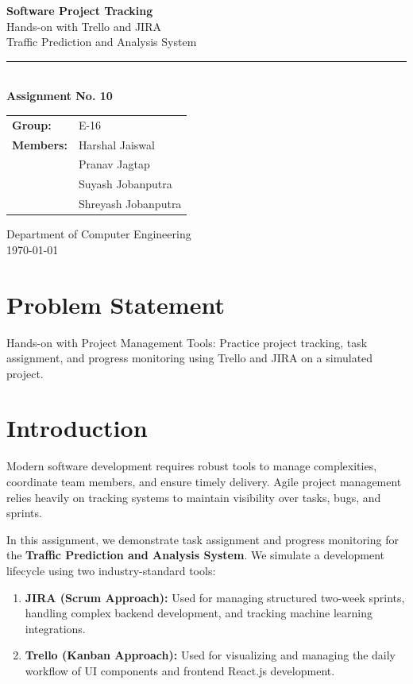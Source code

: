 \documentclass[12pt,a4paper]{article}
\begin{document}
\begin{titlepage}
\centering
\vspace*{2cm}
{\Huge\bfseries\color{headblue} Software Project Tracking\\[12pt]}
{\LARGE Hands-on with Trello and JIRA\\[8pt]}
{\large Traffic Prediction and Analysis System\\[20pt]}
\rule{0.6\textwidth}{1pt}\\[20pt]

{\large\textbf{Assignment No. 10}}\\[30pt]

\begin{tabular}{ll}
\textbf{Group:} & E-16 \\[4pt]
\textbf{Members:} & Harshal Jaiswal \\
 & Pranav Jagtap \\
 & Suyash Jobanputra \\
 & Shreyash Jobanputra \\
\end{tabular}

\vfill
{\small Department of Computer Engineering\\
\today}
\end{titlepage}

\section{Problem Statement}
Hands-on with Project Management Tools: Practice project tracking, task assignment, and progress monitoring using Trello and JIRA on a simulated project.

\section{Introduction}
Modern software development requires robust tools to manage complexities, coordinate team members, and ensure timely delivery. Agile project management relies heavily on tracking systems to maintain visibility over tasks, bugs, and sprints.

In this assignment, we demonstrate task assignment and progress monitoring for the \textbf{Traffic Prediction and Analysis System}. We simulate a development lifecycle using two industry-standard tools:
\begin{enumerate}
    \item \textbf{JIRA (Scrum Approach):} Used for managing structured two-week sprints, handling complex backend development, and tracking machine learning integrations.
    \item \textbf{Trello (Kanban Approach):} Used for visualizing and managing the daily workflow of UI components and frontend React.js development.
\end{enumerate}
\end{document}
